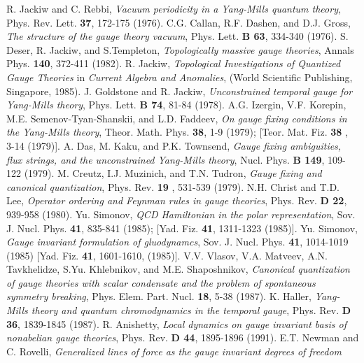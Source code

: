 \documentclass[a4paper,12pt]{article}
\begin{document}
\begin{thebibliography}{99}
%
R. Jackiw and C. Rebbi,
{\it Vacuum periodicity in a Yang-Mills quantum theory},
Phys. Rev. Lett. {\bf 37}, 172-175 (1976).
%
C.G. Callan, R.F. Dashen, and D.J. Gross,
{\it The structure of the gauge theory vacuum},
Phys. Lett. {\bf B 63}, 334-340 (1976).
%
S. Deser, R. Jackiw, and S.Templeton,
{\it Topologically massive gauge theories},
Annals Phys. {\bf 140}, 372-411 (1982).
%
R. Jackiw,
{\it Topological Investigations of Quantized Gauge Theories}
in {\it Current Algebra and Anomalies},
(World Scientific Publishing, Singapore, 1985).
%
J. Goldstone and R. Jackiw,
{\it Unconstrained temporal gauge for Yang-Mills theory},
Phys. Lett. {\bf B 74}, 81-84 (1978).
%
A.G. Izergin, V.F. Korepin, M.E. Semenov-Tyan-Shanskii, and L.D. Faddeev,
{\it On gauge fixing conditions in the Yang-Mills theory},
Theor. Math. Phys. {\bf 38}, 1-9 (1979);
[Teor. Mat. Fiz. {\bf 38 }, 3-14 (1979)].
%
A. Das, M. Kaku, and P.K. Townsend,
{\it Gauge fixing ambiguities, flux strings, and the unconstrained Yang-Mills
theory}, Nucl. Phys. {\bf B 149}, 109-122 (1979).
%
M. Creutz, I.J. Muzinich, and T.N. Tudron,
{\it Gauge fixing and canonical quantization},
Phys. Rev. {\bf 19 }, 531-539 (1979).
%
N.H. Christ and T.D. Lee,
{\it Operator ordering and Feynman rules in gauge theories},
Phys. Rev. {\bf D 22}, 939-958 (1980).
%
Yu. Simonov,
{\it QCD Hamiltonian in the polar representation},
Sov. J. Nucl. Phys. {\bf 41}, 835-841 (1985);
[Yad. Fiz. {\bf 41}, 1311-1323 (1985)].
%
Yu. Simonov,
{\it Gauge invariant formulation of \coordHE{} gluodynamcs},
Sov. J. Nucl. Phys. {\bf 41}, 1014-1019 (1985)
[Yad. Fiz. {\bf 41}, 1601-1610, (1985)].
%
V.V. Vlasov, V.A. Matveev, A.N. Tavkhelidze, S.Yu. Khlebnikov,
and M.E. Shaposhnikov,
{\it Canonical quantization of gauge theories with scalar condensate and
the problem of spontaneous symmetry breaking},
Phys. Elem. Part. Nucl. {\bf 18}, 5-38 (1987).
%
K. Haller,
{\it Yang-Mills theory and quantum chromodynamics in the temporal gauge},
Phys. Rev. {\bf D 36}, 1839-1845 (1987).
%
R. Anishetty,
{\it Local dynamics on gauge invariant basis of nonabelian gauge theories},
Phys. Rev. {\bf D 44}, 1895-1896 (1991).
%
E.T. Newman and C. Rovelli,
{\it Generalized lines of force as the gauge invariant degrees of freedom
}
\end{thebibliography}
\end{document}
